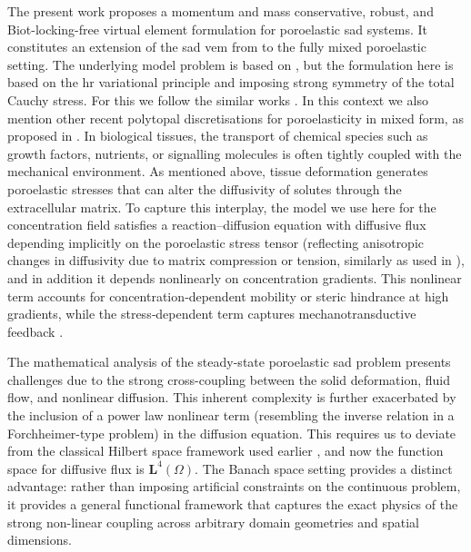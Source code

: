 \documentclass[fleqn,a4paper]{cas-sc}
\newcommand{\0}{\boldsymbol{0}}
\numberwithin{equation}{section}
\numberwithin{figure}{section}
\begin{document}
The present work proposes a momentum and mass conservative, robust, and Biot-locking-free virtual element formulation for poroelastic \gls{sad} systems. It constitutes an extension of the \gls{sad} \gls{vem}  from \cite{khot25} to the fully mixed poroelastic setting.  The underlying model problem is based on \cite{gomez23,careaga25}, but the formulation here is based on the \gls{hr} variational principle and imposing strong symmetry of the total Cauchy stress. For this we follow the similar works \cite{artioli17b,artioli20b,dassi20}. 
In this context we also mention other recent polytopal discretisations for poroelasticity in mixed form, as proposed in \cite{tang2021locking,cadq2023,khot25,botti2021hybrid,botti2025fullymixedvirtualelementmethod,liang2024parameter,kumar2024numerical,guo2022robust,liu2023virtual,droniou2024bubble,wmdh2025}. 
{In biological tissues, the transport of chemical species such as growth factors, nutrients, or signalling molecules is often tightly coupled with the mechanical environment. As mentioned above, tissue deformation generates poroelastic stresses that can alter the diffusivity of solutes through the extracellular matrix. To capture this interplay, the model we use here for the  concentration field satisfies a reaction–diffusion equation with diffusive flux depending implicitly on the  poroelastic stress  tensor (reflecting anisotropic changes in diffusivity due to matrix compression or tension, similarly as used in \cite{gatica18,gatica19,gatica22}), and in addition it depends nonlinearly on concentration gradients. This nonlinear term accounts for concentration‑dependent mobility or steric hindrance at high gradients, while the stress‑dependent term captures mechanotransductive feedback \cite{bollenbach2007morphogen}.}

The mathematical analysis of the steady-state poroelastic \gls{sad} problem presents   challenges due to the strong cross-coupling between the solid deformation, fluid flow, and nonlinear diffusion. This inherent complexity is further exacerbated by the inclusion of a power law  nonlinear term  (resembling the inverse relation in a Forchheimer-type problem) in the diffusion equation. This requires us to deviate from the classical Hilbert space framework used earlier  \cite{gatica18,gatica19,gomez23}, and now   the function space for diffusive flux is $\mathbf{L}^4(\Omega)$. The Banach space setting provides a distinct advantage: rather than imposing artificial constraints on the continuous problem, it provides a general functional framework that captures the exact physics of the strong non-linear coupling across arbitrary domain geometries and spatial dimensions. 
\end{document}
